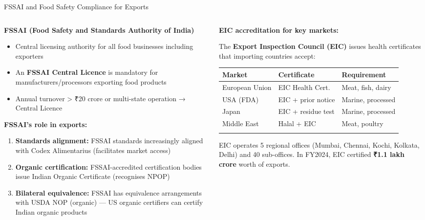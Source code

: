 \documentclass[
  ignorenonframetext,
  aspectratio=169,
]{beamer}
\makeatletter
\providecommand{\tightlist}{%
  \setlength{\itemsep}{0pt}\setlength{\parskip}{0pt}}
\let\quarto@originallabel\label
\DeclareRobustCommand*{\label}[1]{\quarto@originallabel{#1}}
\makeatother
\begin{document}
\begin{frame}
\begin{block}{FSSAI and Food Safety Compliance for Exports}
\label{fssai-and-food-safety-compliance-for-exports}
\begin{columns}[T]
\begin{column}{0.55\linewidth}
\textbf{FSSAI (Food Safety and Standards Authority of India)}

\begin{itemize}
\tightlist
\item
  Central licensing authority for all food businesses including
  exporters
\item
  An \textbf{FSSAI Central Licence} is mandatory for
  manufacturers/processors exporting food products
\item
  Annual turnover \textgreater{} ₹20 crore or multi-state operation →
  Central Licence
\end{itemize}

\textbf{FSSAI's role in exports:}

\begin{enumerate}
\tightlist
\item
  \textbf{Standards alignment:} FSSAI standards increasingly aligned
  with Codex Alimentarius (facilitates market access)
\item
  \textbf{Organic certification:} FSSAI-accredited certification bodies
  issue Indian Organic Certificate (recognises NPOP)
\item
  \textbf{Bilateral equivalence:} FSSAI has equivalence arrangements
  with USDA NOP (organic) --- US organic certifiers can certify Indian
  organic products
\end{enumerate}
\end{column}

\begin{column}{0.45\linewidth}
\textbf{EIC accreditation for key markets:}

The \textbf{Export Inspection Council (EIC)} issues health certificates
that importing countries accept:

\begin{longtable}[]{@{}lll@{}}
\toprule\noalign{}
Market & Certificate & Requirement \\
\midrule\noalign{}
\endhead
European Union & EIC Health Cert. & Meat, fish, dairy \\
USA (FDA) & EIC + prior notice & Marine, processed \\
Japan & EIC + residue test & Marine, processed \\
Middle East & Halal + EIC & Meat, poultry \\
\bottomrule\noalign{}
\end{longtable}

EIC operates 5 regional offices (Mumbai, Chennai, Kochi, Kolkata, Delhi)
and 40 sub-offices. In FY2024, EIC certified \textbf{₹1.1 lakh crore}
worth of exports.
\end{column}
\end{columns}
\end{block}
\end{frame}
\end{document}
